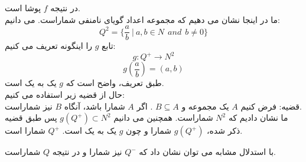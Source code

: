 \begin{ans}
    در نتیجه 
    $f$
    پوشا است.
    \\
    ما در اینجا نشان می دهیم که مجموعه اعداد گویای نامنفی شماراست. می دانیم:
    \[Q^{2} = \{\frac{a}{b} \ | \ a,b \in N \ \ and \ \ b \neq 0\}\]
    تابع 
    $g$
    را اینگونه تعریف می کنیم:
    \[g:Q^{+}\rightarrow N^{2}\]
    \[g(\frac{a}{b}) = (a,b)\]
    طبق تعریف، واضح است که 
    $g$
    یک به یک است.
    \\
    حال از قضیه زیر استفاده می کنیم:
    \\
    قضیه: فرض کنیم 
    $A$
    یک مجموعه و 
    $B \subseteq A$
    . اگر 
    $A$
    شمارا باشد، آنگاه 
    $B$
    نیز شماراست.
    \\
    ما نشان دادیم که 
    $N^{2}$
    شماراست.
    همچنین می دانیم
    $g(Q^{+}) \subset N^{2}$
    پس طبق قضیه ذکر شده، 
    $g(Q^{+})$
    شمارا و چون 
    $g$
    یک به یک است. 
    $Q^{+}$
    شمارا است. 

    با استدلال مشابه می توان نشان داد که
    $Q^{-}$
    نیز شمارا و در نتیجه
    $Q$
    شماراست.


\end{ans}
